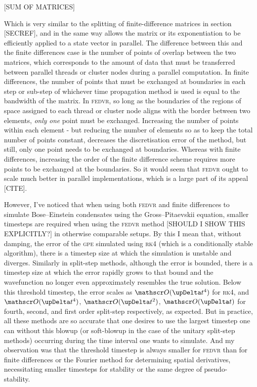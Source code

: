 [SUM OF MATRICES]

Which is very similar to the splitting of finite-difference matrices in section [SECREF], and in the same way allows the matrix or its exponentiation to be efficiently applied to a state vector in parallel. The difference between this and the finite differences case is the number of points of overlap between the two matrices, which corresponds to the amount of data that must be transferred between parallel threads or cluster nodes during a parallel computation. In finite differences, the number of points that must be exchanged at boundaries in each step or sub-step of whichever time propagation method is used is equal to the bandwidth of the matrix. In \textsc{fedvr}, so long as the boundaries of the regions of space assigned to each thread or cluster node aligns with the border between two elements, \emph{only one} point must be exchanged. Increasing the number of points within each element - but reducing the number of elements so as to keep the total number of points constant, decreases the discretisation error of the method, but still, only one point needs to be exchanged at boundaries. Whereas with finite differences, increasing the order of the finite difference scheme requires more points to be exchanged at the boundaries. So it would seem that \textsc{fedvr} ought to scale much better in parallel implementations, which is a large part of its appeal [CITE].

However, I've noticed that when using both \textsc{fedvr} and finite differences to simulate Bose--Einstein condensates using the Gross--Pitaevskii equation, smaller timesteps are required when using the \textsc{fedvr} method [SHOULD I SHOW THIS EXPLICITLY?] in otherwise comparable setups. By this I mean that, without damping, the error of the \textsc{gpe} simulated using \textsc{rk4} (which is a conditionally stable algorithm), there is a timestep size at which the simulation is unstable and diverges. Similarly in split-step methods, although the error is bounded, there is a timestep size at which the error rapidly grows to that bound and the wavefunction no longer even approximately resembles the true solution. Below this threshold timestep, the error scales as $\Ord{\upDelta t^4}$ for \textsc{rk4}, and $\Ord{\upDelta t^4}$, $\Ord{\upDelta t^2}$, $\Ord{\upDelta t}$ for fourth, second, and first order split-step respectively, as expected. But in practice, all these methods are so accurate that one desires to use the largest timestep one can without this blowup (or soft-blowup in the case of the unitary split-step methods) occurring during the time interval one wants to simulate. And my observation was that the threshold timestep is always smaller for \textsc{fedvr} than for finite differences or the Fourier method for determining spatial derivatives, necessitating smaller timesteps for stability or the same degree of pseudo-stability.

